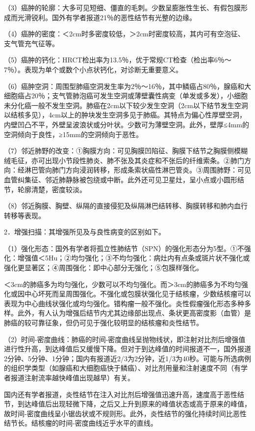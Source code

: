 （3）癌肿的轮廓：大多可见短细、僵直的毛刺。少数呈膨胀性生长、有假包膜形成而光滑锐利。国外有学者报道21％的恶性结节有光整的边缘。

（4）癌肿的密度：＜2cm时多密度较低，＞2cm时密度较高，其内可有空泡征、支气管充气征等。

（5）癌肿的钙化：HRCT检出率为13.5％，优于常规CT检查（检出率6％～7％）。表现为单个或数个小点状钙化，对诊断无重要意义。

（6）癌肿空洞：周围型肺癌空洞发生率为2％～16％，其中鳞癌占80％，腺癌和大细胞癌占20％；支气管肺泡癌可发生空洞或薄壁囊性病变（单发或多发），小细胞未分化癌一般不发生空洞。肺癌在2cm以下较少发生空洞（2cm以下结节发生空洞以结核多见），4cm以上的肿块发生空洞多见于肺癌。其特点为偏心性厚壁空洞，内壁凹凸不平，外壁呈波浪状或分叶状。少数可为薄壁空洞。此外，壁厚≤4mm的空洞倾向于良性，≥15mm的空洞倾向于恶性。

（7）邻近肺野的改变：①胸膜方向：可见胸膜凹陷征、胸膜下结节之胸膜侧模糊绒毛征，亦可出现小节段性肺炎、肺不张及其炎症和不张后的纤维索条。②肺门方向：经淋巴管向肺门方向浸润转移，形成条索状癌性淋巴管炎。③周围肺野：可见血管纠集征、邻近肺静脉被包绕或中断。此外还可见卫星灶，呈小点或小圆形结节，轮廓清楚，密度较淡。

（8）邻近胸膜、胸壁、纵隔的直接侵犯及纵隔淋巴结转移、胸膜转移和肺内血行转移等表现。

2．增强扫描：其增强所见及与良性病变的区别如下。

（1）强化形态：国外有学者将孤立性肺结节（SPN）的强化形态分为5型。①不强化：增强值＜5Hu；②均匀强化；③不均匀强化：病灶内有点条或斑片状不强化或强化更显著区；④周围强化：即中心部分无强化；⑤包膜样强化。

＜3cm的肺癌多为均匀强化，少数可以不均匀强化。而＞3cm的肺癌多为不均匀强化或因中心坏死而呈周围强化。不强化或包膜状强化见于结核瘤，少数结核瘤可以表现为中心曲线状强化或均匀强化。错构瘤一般不强化。炎性假瘤强化形态多种多样。此外，有人认为增强后结节内尤其边缘部出现点、条状更高密度影（血管）是肺癌的较可靠征象，但仍可见于强化较明显的结核瘤和炎性结节。

（2）时间-密度曲线：肺癌的时间-密度曲线呈抛物线状，即注射对比剂后增强值进行性升高，到达峰值后又缓慢下降。但对于到达峰值的时间报道不一，国外报道2分钟、5分钟、1分钟；国内有报道近2/3为2分钟，近1/3为40秒。可能与所选病例的组织学类型（如腺癌和大细胞癌快于鳞癌）、对比剂用量和注射速度不同（有学者报道注射流率越快峰值出现越早）有关。

国内还有学者报道，炎性结节在注入对比剂后增强值迅速升高，速度高于恶性结节，到达峰值后出现轻微下降，之后又上升到原来的峰值状态或高于原来的峰值，故时间-密度曲线呈小锯齿状或不规则形。此外，炎性结节的强化持续时间比恶性结节长。结核瘤的时间-密度曲线近乎水平的直线。

